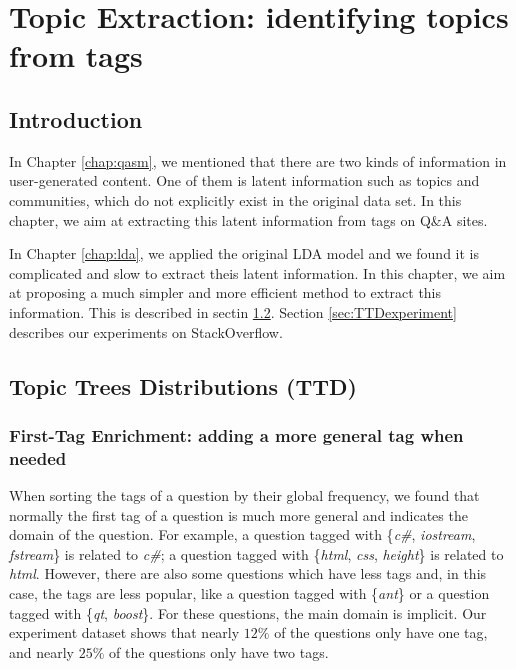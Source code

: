 \chapter{Topic Extraction: identifying topics from tags}
\doublespacing
\label{chap:ttd}
\minitoc

\section{Introduction}
In Chapter \ref{chap:qasm}, we mentioned that there are two kinds of information in user-generated content. One of them is latent information such as topics and communities, which do not explicitly exist in the original data set. In this chapter, we aim at extracting this latent information from tags on Q\&A sites.

In Chapter \ref{chap:lda}, we applied the original LDA model and we found it is complicated and slow to extract theis latent information. In this chapter, we aim at proposing a much simpler and more efficient method to extract this information. This is described in sectin \ref{sec:TTD}. Section \ref{sec:TTDexperiment} describes our experiments on StackOverflow.

\section{Topic Trees Distributions (TTD)}\label{sec:TTD}




\subsection{First-Tag Enrichment: adding a more general tag when needed}
When sorting the tags of a question by their global frequency, we found that normally the first tag of a question is much more general and indicates the domain of the question. For example, a question tagged with \{\textit{c\#}, \textit{iostream}, \textit{fstream}\} is related to \textit{c\#}; a question tagged with \{\textit{html}, \textit{css}, \textit{height}\} is related to \textit{html}. However, there are also some questions which have less tags and, in this case, the tags are less popular, like a question tagged with \{\textit{ant}\} or a question tagged with \{\textit{qt}, \textit{boost}\}. For these questions, the main domain is implicit. Our experiment dataset shows that nearly $12\%$ of the questions only have one tag, and nearly $25\%$ of the questions only have two tags.


